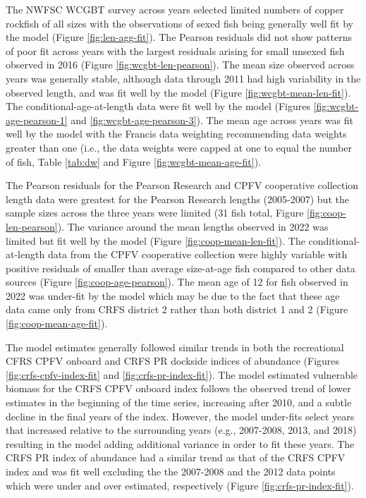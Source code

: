 \documentclass[11pt,
  english,
  letterpaper,
]{article}
\begin{document}
The NWFSC WCGBT survey across years selected limited numbers of copper rockfish of all sizes with the observations of sexed fish being generally well fit by the model (Figure \ref{fig:len-agg-fit}). The Pearson residuals did not show patterns of poor fit across years with the largest residuals arising for small unsexed fish observed in 2016 (Figure \ref{fig:wcgbt-len-pearson}). The mean size observed across years was generally stable, although data through 2011 had high variability in the observed length, and was fit well by the model (Figure \ref{fig:wcgbt-mean-len-fit}). The conditional-age-at-length data were fit well by the model (Figures \ref{fig:wcgbt-age-pearson-1} and \ref{fig:wcgbt-age-pearson-3}). The mean age across years was fit well by the model with the Francis data weighting recommending data weights greater than one (i.e., the data weights were capped at one to equal the number of fish, Table \ref{tab:dw} and Figure \ref{fig:wcgbt-mean-age-fit}).

The Pearson residuals for the Pearson Research and CPFV cooperative collection length data were greatest for the Pearson Research lengths (2005-2007) but the sample sizes across the three years were limited (31 fish total, Figure \ref{fig:coop-len-pearson}). The variance around the mean lengths observed in 2022 was limited but fit well by the model (Figure \ref{fig:coop-mean-len-fit}). The conditional-at-length data from the CPFV cooperative collection were highly variable with positive residuals of smaller than average size-at-age fish compared to other data sources (Figure \ref{fig:coop-age-pearson}). The mean age of 12 for fish observed in 2022 was under-fit by the model which may be due to the fact that these age data came only from CRFS district 2 rather than both district 1 and 2 (Figure \ref{fig:coop-mean-age-fit}).

The model estimates generally followed similar trends in both the recreational CFRS CPFV onboard and CRFS PR dockside indices of abundance (Figures \ref{fig:crfs-cpfv-index-fit} and \ref{fig:crfs-pr-index-fit}). The model estimated vulnerable biomass for the CRFS CPFV onboard index follows the observed trend of lower estimates in the beginning of the time series, increasing after 2010, and a subtle decline in the final years of the index. However, the model under-fits select years that increased relative to the surrounding years (e.g., 2007-2008, 2013, and 2018) resulting in the model adding additional variance in order to fit these years. The CRFS PR index of abundance had a similar trend as that of the CRFS CPFV index and was fit well excluding the the 2007-2008 and the 2012 data points which were under and over estimated, respectively (Figure \ref{fig:crfs-pr-index-fit}).
\end{document}

